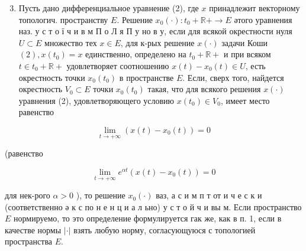 \documentclass[10pt]{article}
\begin{document}
\begin{enumerate}

  \setcounter{enumi}{2}

  \item Пусть дано дифференциальное уравнение (2), где $x$ принадлежит векторному топологич. пространству $E$. Решение $x_{0}(\cdot): t_{0}+\mathbb{R}+\rightarrow E$ әтого уравнения наз. у с т о ї ч и в м П о Л я П у но в у, если для всякой окрестности нуля $U \subset E$ множество тех $x \in E$, для к-рых решение $x(\cdot)$ задачи Коши $(2), x\left(t_{0}\right)=x$ единственно, определено на $t_{0}+\mathbb{R}+$ и при всяком $t \in t_{0}+\mathbb{R}+$ удовлетворяет соотношению $x(t)-x_{0}(t) \in U$, есть окрестность точки $x_{0}\left(t_{0}\right)$ в пространстве $E$. Если, сверх того, найдется окрестность $V_{0} \subset E$ точки $x_{0}\left(t_{0}\right)$ такая, что для всякого решения $x(\cdot)$ уравнения (2), удовлетворяющего условию $x\left(t_{0}\right) \in V_{0}$, имеет место равенство

\end{enumerate}



\[

\lim _{t \rightarrow+\infty}\left(x(t)-x_{0}(t)\right)=0

\]



(равенство



\[

\lim _{t \rightarrow+\infty} e^{\alpha t}\left(x(t)-x_{0}(t)\right)=0

\]



для нек-рого $\alpha>0$ ), то решение $x_{0}(\cdot)$ ваз, а с и м п т от и ч е с к и (соответственно ә к с по н е н ц и а л ьно) у с т о й ч и вы м. Если пространство $E$ нормируемо, то это определение формулируется гак же, как в п. 1, если в качестве нормы $|\cdot|$ взять любую норму, согласующуюся с топологией пространства $E$.
\end{document}
